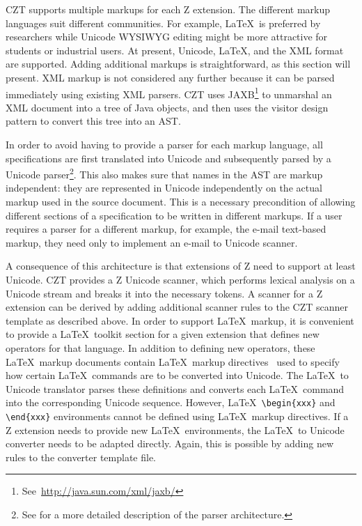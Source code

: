 \documentclass{llncs}
\begin{document}
 CZT supports multiple markups for each Z extension.  The different
 markup languages suit different communities.  For example, \LaTeX\ is
 preferred by researchers while Unicode WYSIWYG editing might be more
 attractive for students or industrial users. At present, Unicode,
 \LaTeX, and the XML format are supported.  Adding additional markups
 is straightforward, as this section will present.  XML markup is not
 considered any further because it can be parsed immediately using
 existing XML parsers.  CZT uses
 JAXB\footnote{See~\url{http://java.sun.com/xml/jaxb/}} to unmarshal an
 XML document into a tree of Java objects, and then uses the visitor
 design pattern to convert this tree into an AST.

In order to avoid having to provide a parser for each markup language,
all specifications are first translated into Unicode and subsequently
parsed by a Unicode parser\footnote{See \cite{czt} for a more detailed
description of the parser architecture.}.  This also makes sure that
names in the AST are markup independent: they are represented in
Unicode independently on the actual markup used in the source
document.  This is a necessary precondition of allowing different
sections of a specification to be written in different markups.  If a
user requires a parser for a different markup, for example, the e-mail
text-based markup, they need only to implement an e-mail to Unicode
scanner.

A consequence of this architecture is that extensions of Z need
to support at least Unicode.  CZT provides a Z Unicode scanner, which
performs lexical analysis on a Unicode stream and breaks it into the
necessary tokens.  A scanner for a Z extension can be derived by
adding additional scanner rules to the CZT scanner template as
described above.  In order to support \LaTeX\ markup, it is convenient
to provide a \LaTeX\ toolkit section for a given extension that
defines new operators for that language.  In
addition to defining new operators, these \LaTeX\ markup documents
contain \LaTeX\ markup directives~\cite{isoz,czt} used to specify how
certain \LaTeX\ commands are to be converted into Unicode.  The
\LaTeX\ to Unicode translator parses these definitions and converts
each \LaTeX\ command into the corresponding Unicode sequence.
However, \LaTeX\ \verb+\begin{xxx}+ and \verb+\end{xxx}+ environments
cannot be defined using \LaTeX\ markup directives.  If a Z extension
needs to provide new \LaTeX\ environments, the \LaTeX\ to Unicode converter
needs to be adapted directly.  Again, this is possible by adding new
rules to the converter template file.
\end{document}
